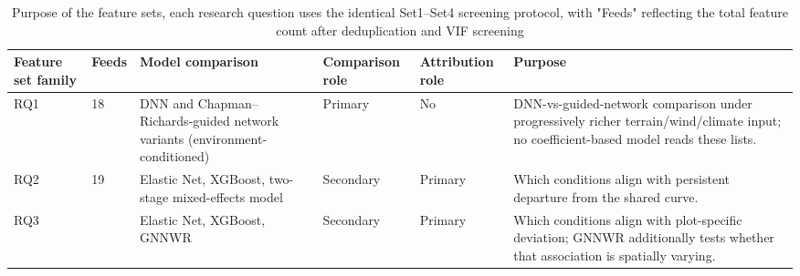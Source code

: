 \begin{table}[!htbp]
\centering
\scriptsize
\renewcommand{\arraystretch}{1.2}
\begin{tabular}{p{2.1cm}p{0.8cm}p{3.4cm}p{1.5cm}p{1.4cm}p{3.1cm}}
\toprule
Feature set family & Feeds & Model comparison & Comparison role & Attribution role & Purpose \\
\midrule
RQ1 & 18 & DNN and Chapman--Richards-guided network variants (environment-conditioned) & Primary &
No & DNN-vs-guided-network comparison under progressively richer terrain/wind/climate input; no
coefficient-based model reads these lists. \\
RQ2 & 19 & Elastic Net, XGBoost, two-stage mixed-effects model & Secondary & Primary & Which
conditions align with persistent departure from the shared curve. \\
RQ3 & \ct{RQ3's Set4 total column count -- pull from the actual feature manifest, don't guess (not
derivable from the old Set5 total, since Set4 and Set5 were independently VIF-screened, not
nested)} & Elastic Net, XGBoost, GNNWR & Secondary & Primary & Which conditions align with
plot-specific deviation; GNNWR additionally tests whether that association is spatially
varying. \\
\bottomrule
\end{tabular}
\caption{Purpose of the feature sets, each research question uses the identical Set1--Set4 screening protocol, with "Feeds" reflecting the total feature count after deduplication and VIF screening}
\label{tab:feature-set-purpose}
\end{table}


